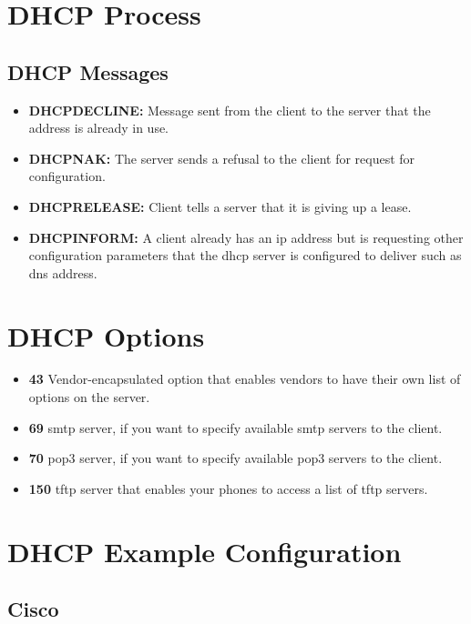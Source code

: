\section{DHCP Process}


\subsection{DHCP Messages}

\begin{itemize}
    \item \textbf{DHCPDECLINE:} Message sent from the client to the server that the address is already in use.
    \item \textbf{DHCPNAK:} The server sends a refusal to the client for request for configuration.
    \item \textbf{DHCPRELEASE:} Client tells a server that it is giving up a lease.
    \item \textbf{DHCPINFORM:} A client already has an \gls{ip} address but is requesting other configuration parameters that the \gls{dhcp} server is configured to deliver such as \gls{dns} address.
\end{itemize}

\section{DHCP Options}

\begin{itemize}
    \item \textbf{43} Vendor-encapsulated option that enables vendors to have their own list of options on the server.
    \item \textbf{69} \gls{smtp} server, if you want to specify available \gls{smtp} servers to the client.
    \item \textbf{70} \gls{pop3} server, if you want to specify available \gls{pop3} servers to the client.
    \item \textbf{150} \gls{tftp} server that enables your phones to access a list of \gls{tftp} servers.
\end{itemize}

\section{DHCP Example Configuration}

\subsection{Cisco}


